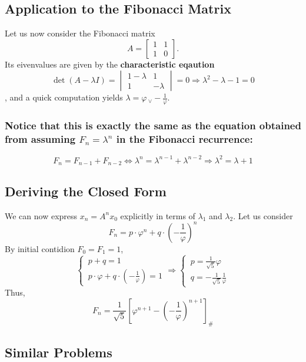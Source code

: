 \documentclass[11pt]{article}
\begin{document}
\subsection{Application to the Fibonacci Matrix}
Let us now consider the Fibonacci matrix
\[
    A = \begin{bmatrix} 1 & 1 \\ 1 & 0 \end{bmatrix}.
\]
Its eivenvalues are given by the \textbf{characteristic eqaution}
\[
    \det(A-\lambda I)=\begin{vmatrix}
        1-\lambda & 1\\1 & -\lambda
    \end{vmatrix}=0 \Rightarrow \boxed{\lambda^2 - \lambda - 1 = 0}
\]
, and a quick computation yields $\displaystyle\lambda = \varphi \,_\lor -\frac{1}{\varphi}$.\\
\subsubsection*{Notice that this is exactly the same as the equation obtained from assuming $F_n = \lambda^n$ in the Fibonacci recurrence:}
\[
    F_n = F_{n-1} + F_{n-2} \Leftrightarrow \lambda^n  = \lambda^{n-1} + \lambda^{n-2} \Rightarrow  \boxed{\lambda^2  = \lambda + 1}
\]
\subsection{Deriving the Closed Form}
We can now express $x_n = A^n x_0$ explicitly in terms of $\lambda_1$ and $\lambda_2$. Let us consider
\[
    F_n=p\cdot\varphi^n + q\cdot(-\frac{1}{\varphi})^n
\]
By initial contidion $F_0=F_1=1$, 
\[
    \begin{cases}
        \displaystyle
        \,p+q=1\\
        \displaystyle
        \,p\cdot\varphi + q\cdot (-\frac{1}{\varphi}) = 1
    \end{cases}
    \Rightarrow
    \begin{cases}
        \displaystyle
        \,p=\frac{1}{\sqrt{5}}\varphi\\
        \displaystyle
        \,q=-\frac{1}{\sqrt{5}}\frac{1}{\varphi}
    \end{cases}
\]
Thus, 
\[
    F_n = \frac{1}{\sqrt{5}}\left[\varphi^{n+1} - (-\frac{1}{\varphi})^{n+1}\right] _\#
\]
\subsection{Similar Problems}
\end{document}
